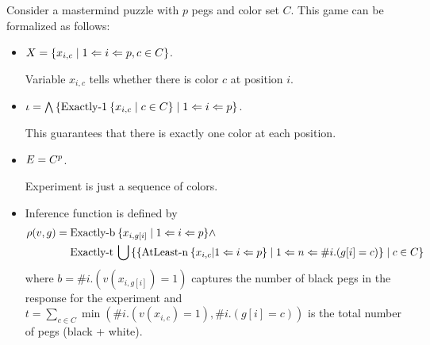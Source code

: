 \begin{example}[Mastermind]
Consider a mastermind puzzle with $p$ pegs and color set $C$. This game can be formalized as follows:

\begin{itemize}
\item
 $X = \{x_{i,c} \;|\; 1<=i<=p, c\in C\}$. 

 Variable $x_{i,c}$ tells whether there is color $c$ at position $i$.

\item 
 $\iota = \bigwedge\left\{ \textrm{Exactly-1}\: \{x_{i,c} \;|\; c\in C\} \;|\; 1<=i<=p\right\}$.

 This guarantees that there is exactly one color at each position.

\item $E = C^p$.

 Experiment is just a sequence of colors.

\item Inference function is defined by
\begin{align*}
\rho(v, g) =\;&\textrm{Exactly-b}\:\{ x_{i, g[i]} \;|\; 1<=i<=p \} \wedge \\
& \textrm{Exactly-t}\: \bigcup
		\left\{ 
			\{
				\textrm{AtLeast-n}\:\{ x_{i,c} | 1<=i<=p \} 
				\;|\; 1<=n<=\#i.(g[i]=c)
			\} 
			\;|\; c\in C 
		\right\} 
\end{align*}
where $b = \# i . (v(x_{i,g[i]}) = 1)$ captures the number of black pegs in the response for the experiment and
$t = \sum_{c\in C} \min( \#i.(v(x_{i,c}) = 1), \#i.(g[i]=c))$ is the total number of pegs (black + white). 

\end{itemize}
\end{example}





